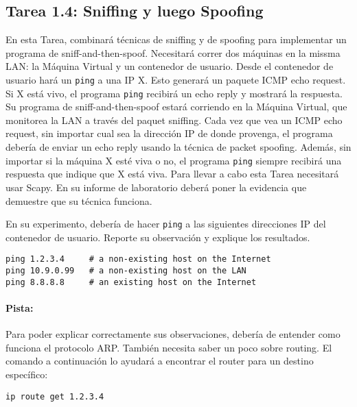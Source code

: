 \subsection{Tarea 1.4: Sniffing y luego Spoofing}  

En esta Tarea, combinará técnicas de sniffing y de spoofing para implementar un programa de sniff-and-then-spoof.
Necesitará correr dos máquinas en la missma LAN: la Máquina Virtual y un contenedor de usuario. Desde el contenedor de usuario hará un {\tt ping} a una IP X. Esto generará un paquete ICMP echo request. Si X está vivo, el programa {\tt ping} recibirá un echo reply y mostrará la respuesta. Su programa de sniff-and-then-spoof estará corriendo en la Máquina Virtual, que monitorea la LAN a través del paquet sniffing. Cada vez que vea un ICMP echo request, sin importar cual sea la dirección IP de donde provenga, el programa debería de enviar un echo reply usando la técnica de packet spoofing. Además, sin importar si la máquina X esté viva o no, el programa {\tt ping} siempre recibirá una respuesta que indique que X está viva. Para llevar a cabo esta Tarea necesitará usar Scapy. En su informe de laboratorio deberá poner la evidencia que demuestre que su técnica funciona.

En su experimento, debería de hacer \texttt{ping} a las siguientes direcciones IP del contenedor de usuario.
Reporte su observación y explique los resultados.

\begin{lstlisting}
ping 1.2.3.4     # a non-existing host on the Internet
ping 10.9.0.99   # a non-existing host on the LAN
ping 8.8.8.8     # an existing host on the Internet
\end{lstlisting}


\paragraph{Pista:} Para poder explicar correctamente sus observaciones, debería de entender como funciona el protocolo ARP. También necesita saber un poco sobre routing. El comando a continuación lo ayudará a encontrar el router para un destino específico:

\begin{lstlisting}
ip route get 1.2.3.4 
\end{lstlisting}
 
 


